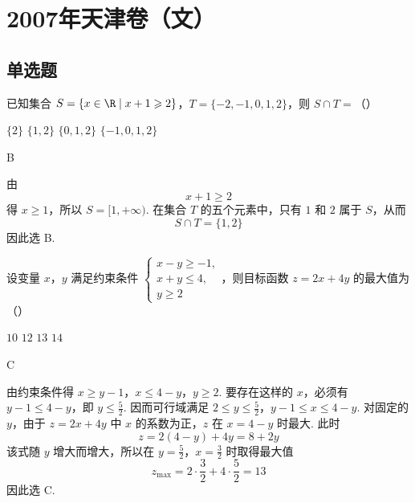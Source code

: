 \chapter{2007年天津卷（文）}


\section{单选题}

\begin{problem}
已知集合 \( S = \{x \in \R \mid x + 1 \geqslant 2\} \)，\( T = \{-2, -1, 0, 1, 2\} \)，则 \( S \cap T = \)（\quad）

\choices
    {\(\{2\}\)}
    {\(\{1, 2\}\)}
    {\(\{0, 1, 2\}\)}
    {\(\{-1, 0, 1, 2\}\)}
\end{problem}

\begin{answer}
B
\end{answer}

\begin{solution}
由
\[
x+1\geqslant2
\]
得 \(x\geqslant1\)，所以 \(S=[1,+\infty)\). 在集合 \(T\) 的五个元素中，只有 \(1\) 和 \(2\) 属于 \(S\)，从而
\[
S\cap T=\{1,2\}
\]
因此选 B.
\end{solution}

\begin{problem}
设变量 \(x\)，\(y\) 满足约束条件 \(\begin{cases}
x-y\geqslant-1,\\
x+y\leqslant4,\\
y\geqslant2
\end{cases}\)，则目标函数 \(z = 2x + 4y\) 的最大值为（\quad）

\choices
    {\(10\)}
    {\(12\)}
    {\(13\)}
    {\(14\)}
\end{problem}

\begin{answer}
C
\end{answer}

\begin{solution}
由约束条件得
\(x\geqslant y-1\)，\(x\leqslant4-y\)，\(y\geqslant2\).
要存在这样的 \(x\)，必须有 \(y-1\leqslant4-y\)，即 \(y\leqslant\frac52\). 因而可行域满足
\(2\leqslant y\leqslant\frac52\)，\(y-1\leqslant x\leqslant4-y\).
对固定的 \(y\)，由于 \(z=2x+4y\) 中 \(x\) 的系数为正，\(z\) 在 \(x=4-y\) 时最大. 此时
\[
z=2(4-y)+4y=8+2y
\]
该式随 \(y\) 增大而增大，所以在 \(y=\frac52\)，\(x=\frac32\) 时取得最大值
\[
z_{\max}=2\cdot\frac32+4\cdot\frac52=13
\]
因此选 C.
\end{solution}

